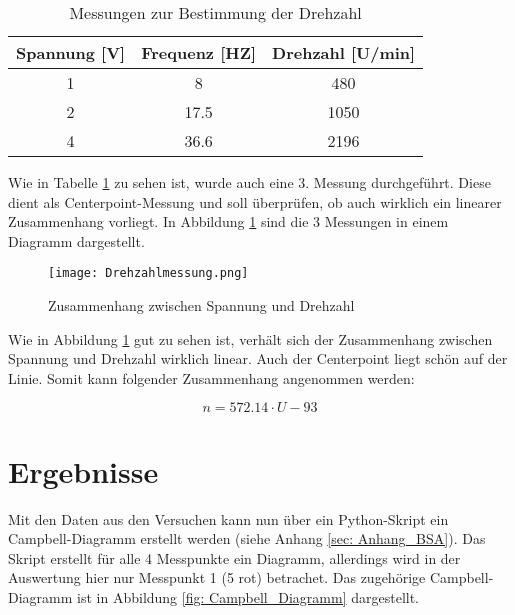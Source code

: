     \begin{table}[H]
        \centering
        \begin{tabular}{|c|c|c|}
            \hline
            \textbf{Spannung [V]} & \textbf{Frequenz [HZ]} & \textbf{Drehzahl [U/min]} \\
            \hline \hline
            1   &   8   &   480 \\
            \hline
            2   &   17.5    &   1050 \\
            \hline
            4   &   36.6    &   2196 \\
            \hline
        \end{tabular}
        \caption{Messungen zur Bestimmung der Drehzahl}
        \label{tab: Drehzahlmessung}
    \end{table}

    \noindent
    Wie in Tabelle \ref{tab: Drehzahlmessung} zu sehen ist, wurde auch eine 3.
    Messung durchgeführt. Diese dient als Centerpoint-Messung und soll
    überprüfen, ob auch wirklich ein linearer Zusammenhang vorliegt. In Abbildung
    \ref{fig: Drehzahlmessung} sind die 3 Messungen in einem Diagramm dargestellt.

    \begin{figure}[H]
        \centering
        \texttt{[image: Drehzahlmessung.png]}
        \caption{Zusammenhang zwischen Spannung und Drehzahl}
        \label{fig: Drehzahlmessung}
    \end{figure}

    \noindent
    Wie in Abbildung \ref{fig: Drehzahlmessung} gut zu sehen ist, verhält sich
    der Zusammenhang zwischen Spannung und Drehzahl wirklich linear. Auch der
    Centerpoint liegt schön auf der Linie. Somit kann folgender Zusammenhang
    angenommen werden:

    \begin{equation*}
        n = 572.14 \cdot U - 93
    \end{equation*}

\section{Ergebnisse}
    Mit den Daten aus den Versuchen kann nun über ein Python-Skript ein
    Campbell-Diagramm erstellt werden (siehe Anhang \ref{sec: Anhang_BSA}). Das
    Skript erstellt für alle 4 Messpunkte ein Diagramm, allerdings wird in der
    Auswertung hier nur Messpunkt 1 (5 rot) betrachet. Das zugehörige
    Campbell-Diagramm ist in Abbildung \ref{fig: Campbell_Diagramm} dargestellt.

